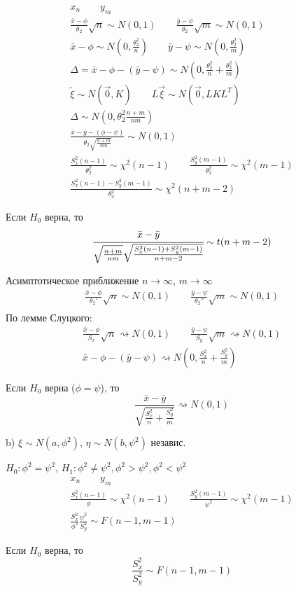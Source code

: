 \documentclass{article}
\begin{document}
\begin{gather*}
  x_n \qquad y_m \\ 
  \frac{\bar{x}-\phi}{\theta_2}\sqrt{n} \sim N(0,1) \qquad \frac{\bar{y}-\psi}{\theta_2}\sqrt{m} \sim N(0,1) \\ 
  \bar{x}-\phi \sim N(0, \frac{\theta_2^{2}}{n}) \qquad \bar{y}-\psi \sim N(0, \frac{\theta_2^{2}}{m}) \\ 
  \Delta = \bar{x} - \phi - (\bar{y}-\psi) \sim N(0, \frac{\theta_2^{2}}{n}+\frac{\theta_2^{2}}{m}) \\ 
  \tilde{\xi} \sim N(\vec{0}, K) \qquad L\vec{\xi}\sim N(\vec{0}, LKL^{T}) \\ 
  \Delta \sim N(0, \theta_2^{2}\frac{n+m}{nm}) \\ 
  \frac{\bar{x}-\bar{y}-(\phi -\psi)}{\theta_2 \sqrt{\frac{n+m}{nm}}} \sim N(0,1) \\ 
  \frac{S_x^{2}(n-1)}{\theta_2^{2}} \sim \chi^{2}(n-1) \qquad \frac{S_y^{2}(m-1)}{\theta_2^{2}} \sim \chi^{2}(m-1) \\ 
  \frac{S_x^{2}(n-1)-S_y^{2}(m-1)}{\theta_2^{2}} \sim \chi^{2}(n+m-2)
\end{gather*}
\begin{theorem}
  Если $H_0$ верна, то
  \[
    \cfrac{\bar{x}-\bar{y}}{\sqrt{\frac{n+m}{nm}}\sqrt{\frac{S_x^{2}(n-1)+S_y^{2}(m-1)}{n+m-2}}} \sim t(n+m-2)
  \]
\end{theorem}
Асимптотическое приближение $n\to \infty$, $m \to \infty$
\begin{gather*}
  \frac{\bar{x}-\phi}{\theta_2'}\sqrt{n} \sim N(0,1) \qquad \frac{\bar{y}-\psi}{\theta_2''}\sqrt{m} \sim N(0,1) \\ 
\end{gather*}
По лемме Слуцкого:
\begin{gather*}
  \frac{\bar{x}-\phi}{S_x}\sqrt{n} \rightsquigarrow N(0,1) \qquad \frac{\bar{y}-\psi}{S_y}\sqrt{m} \rightsquigarrow N(0,1) \\ 
  \bar{x}-\phi - (\bar{y}-\psi) \rightsquigarrow N(0, \frac{S_x^{2}}{n} + \frac{S_y^{2}}{m})
\end{gather*}
\begin{theorem}
  Если $H_0$ верна ($\phi=\psi$), то
  \[
    \frac{\bar{x}-\bar{y}}{\sqrt{\frac{S_x^{2}}{n}+\frac{S_y^{2}}{m}}} \rightsquigarrow N(0,1)
  \]
\end{theorem}

b) $\xi \sim N(a, \phi^{2})$, $\eta \sim N(b, \psi^{2})$ независ.

$H_0: \phi^{2}=\psi^{2}$, $H_1: \phi^{2}\neq \psi^{2}, \phi^{2} > \psi ^{2}, \phi^{2} < \psi ^{2}$
\begin{gather*}
  x_n \qquad y_m \\ 
  \frac{S_x^{2}(n-1)}{\phi} \sim \chi^{2}(n-1) \qquad \frac{S_y^{2}(m-1)}{\psi^{2}} \sim \chi^{2}(m-1) \\ 
  \frac{S_x^{2}}{\phi^{2}}\frac{\psi^{2}}{S_y^{2}} \sim F(n-1,m-1)
\end{gather*}
\begin{theorem}
  Если $H_0$ верна, то 
  \[
    \frac{S_x^{2}}{S_y^{2}} \sim F(n-1, m-1)
  \]
\end{theorem}
\end{document}
